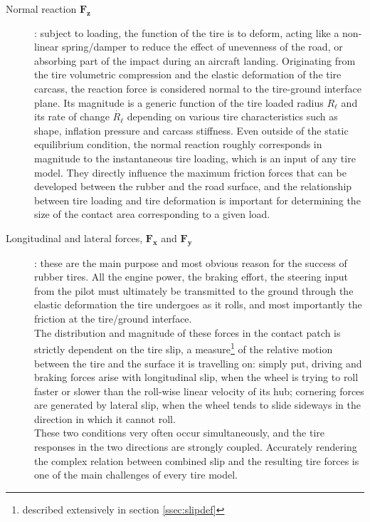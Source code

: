 \documentclass[12pt,a4paper]{report}
\begin{document}
\begin{description}
\item[Normal reaction $\mathbf{F_z}$]: subject to loading, the function of the tire is to deform, acting like a non-linear spring/damper to reduce the effect of unevenness of the road, or absorbing part of the impact during an aircraft landing. Originating from the tire volumetric compression and the elastic deformation of the tire carcass, the reaction force is considered normal to the tire-ground interface plane.
Its magnitude is a generic function of the tire loaded radius $R_\ell$ and its rate of change $\dot{R_\ell}$ depending on various tire characteristics such as shape, inflation pressure and carcass stiffness.
Even outside of the static equilibrium condition, the normal reaction roughly corresponds in magnitude to the instantaneous tire loading, which is an input of any tire model. They directly influence the maximum friction forces that can be developed between the rubber and the road surface, and the relationship between tire loading and tire deformation is important for determining the size of the contact area corresponding to a given load.

\item[Longitudinal and lateral forces, $\mathbf{F_x}$ and $\mathbf{F_y}$]: these are the main purpose and most obvious reason for the success of rubber tires. All the engine power, the braking effort, the steering input from the pilot must ultimately be transmitted to the ground through the elastic deformation the tire undergoes as it rolls, and most importantly the friction at the tire\slash ground interface.\\
The distribution and magnitude of these forces in the contact patch is strictly dependent on the tire slip, a measure\footnote{described extensively in section \ref{ssec:slipdef}} of the relative motion between the tire and the surface it is travelling on: simply put, driving and braking forces arise with longitudinal slip, when the wheel is trying to roll faster or slower than the roll-wise linear velocity of its hub; cornering forces are generated by lateral slip, when the wheel tends to slide sideways in the direction in which it cannot roll.\\
These two conditions very often occur simultaneously, and the tire responses in the two directions are strongly coupled. Accurately rendering the complex relation between combined slip and the resulting tire forces is one of the main challenges of every tire model. 


\end{description}
\end{document}
